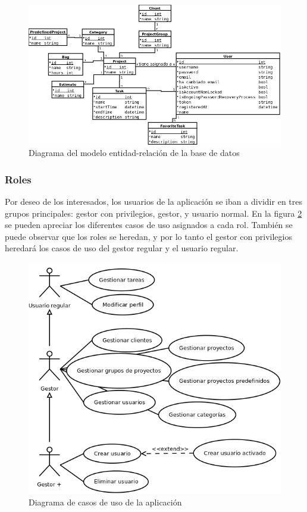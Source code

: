 \begin{figure}[p]
    \center
    \includegraphics[angle=90,scale=0.6]{img/erDiagram}
    \caption{Diagrama del modelo entidad-relación de la base de
datos\label{fig:erdiag}}
\end{figure}

\subsubsection{Roles}
\label{sec:roles}
Por deseo de los interesados, los usuarios de la aplicación se iban a dividir
en tres grupos principales: gestor con privilegios, gestor, y usuario normal.
En la figura \ref{fig:useCases} se pueden apreciar los diferentes casos de uso
asignados a cada rol. También se puede observar que los roles se heredan, y por
lo tanto el gestor con privilegios heredará los casos de uso del gestor regular
y el usuario regular.

\begin{figure}[p]
    \center
    \includegraphics[scale=0.6]{img/useCase}
    \caption{Diagrama de casos de uso de la aplicación}
    \label{fig:useCases}
\end{figure}

